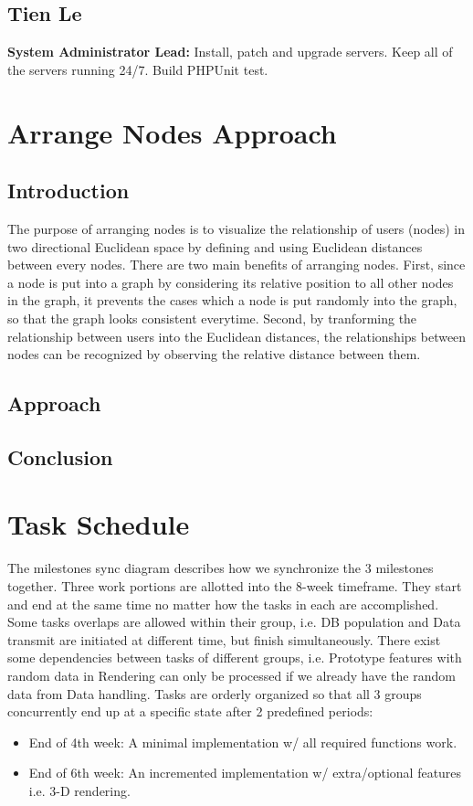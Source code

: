 \documentclass[12pt, letterpaper]{article}
\begin{document}
  \subsection{Tien Le}
  {\bf System Administrator Lead:} Install, patch and upgrade servers. Keep all of the servers running 24/7. Build PHPUnit test.

\section{Arrange Nodes Approach}
 \subsection{Introduction}
  The purpose of arranging nodes is to visualize the relationship of
  users (nodes) in two directional Euclidean space by defining and using Euclidean distances between
  every nodes. There are two main benefits of arranging nodes. First,
  since a node is put into a graph by considering its relative
  position to all other nodes in the graph, it prevents the cases
  which a node is put randomly into the graph, so that the graph looks
  consistent everytime. Second, by tranforming the relationship between
  users into the Euclidean distances, the relationships between nodes
  can be recognized by observing the relative distance between them. 
 
\subsection{Approach}


 \subsection{Conclusion}

\section{Task Schedule}

The milestones sync diagram describes how we synchronize the 3 milestones together. Three work portions are allotted into the 8-week timeframe. They start and end at the same time no matter how the tasks in each are accomplished. Some tasks overlaps are allowed within their group, i.e. DB population and Data transmit are initiated at different time, but finish simultaneously. There exist some dependencies between tasks of different groups, i.e. Prototype features with random data in Rendering can only be processed if we already have the random data from Data handling. Tasks are orderly organized so that all 3 groups concurrently end up at a specific state after 2 predefined periods:
  \begin{itemize}
    \item End of 4th week:  A minimal implementation w/ all required functions work.
    \item End of 6th week: An incremented implementation w/ extra/optional features i.e. 3-D rendering.
  \end{itemize}
\end{document}
